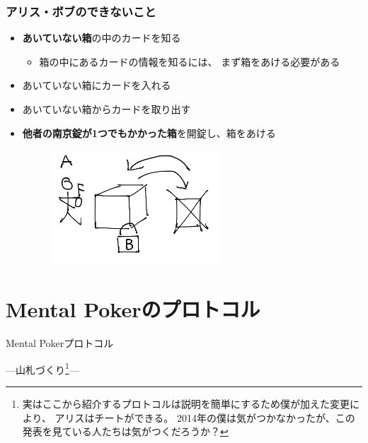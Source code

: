 \begin{frame}
  \frametitle{アリス・ボブのできないこと}

  \pause
  \begin{itemize}
    \item<+-> \textbf{あいていない箱}の中のカードを知る
    \begin{itemize}
      \item 箱の中にあるカードの情報を知るには、
      まず箱をあける必要がある
    \end{itemize}
   
    \item<+-> あいていない箱にカードを入れる
    \item<+-> あいていない箱からカードを取り出す
    
    \item<+-> \textbf{他者の南京錠が1つでもかかった箱}を開錠し、箱をあける
    \begin{figure}[h]
      \includegraphics[width=0.6\textwidth]{img/we_can_not.png}
    \end{figure}
  \end{itemize}
\end{frame}

\section{Mental Pokerのプロトコル}

\begin{frame}

  \centering
  {\huge Mental Pokerプロトコル}

  \vspace{1em}

  ---山札づくり\footnote[frame]{%
    実はここから紹介するプロトコルは説明を簡単にするため僕が加えた変更により、
    アリスはチートができる。
    2014年の僕は気がつかなかったが、この発表を見ている人たちは気がつくだろうか？
  }---
\end{frame}

